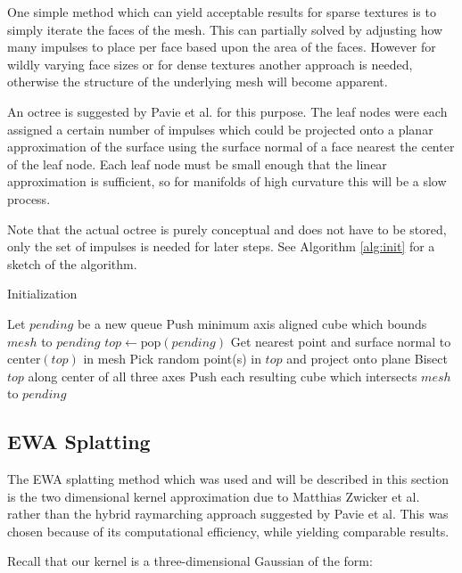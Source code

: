 \documentclass{article}
\begin{document}
One simple method which can yield acceptable results for sparse textures is to simply iterate the faces of the mesh. This can partially solved by adjusting how many impulses to place per face based upon the area of the faces. However for wildly varying face sizes or for dense textures another approach is needed, otherwise the structure of the underlying mesh will become apparent.

An octree is suggested by Pavie et al. for this purpose. The leaf nodes were each assigned a certain number of impulses which could be projected onto a planar approximation of the surface using the surface normal of a face nearest the center of the leaf node.
Each leaf node must be small enough that the linear approximation is sufficient, so for manifolds of high curvature this will be a slow process.

Note that the actual octree is purely conceptual and does not have to be stored, only the set of impulses is needed for later steps. See Algorithm \ref{alg:init} for a sketch of the algorithm.

\begin{algorithm}
\caption{Initialization} \label{alg:init}
\begin{algorithmic}
\State Let ${pending}$ be a new queue
\State Push minimum axis aligned cube which bounds ${mesh}$ to ${pending}$
\State ${top} \gets \text{pop}({pending})$
\State Get nearest point and surface normal to $\text{center}({top})$ in mesh
\State Pick random point(s) in ${top}$ and project onto plane
\Else
\State Bisect ${top}$ along center of all three axes
\State Push each resulting cube which intersects ${mesh}$ to ${pending}$
\EndIf
\EndWhile
\end{algorithmic}
\end{algorithm}

\subsection{EWA Splatting}

The EWA splatting method which was used and will be described in this section is the two dimensional kernel approximation due to Matthias Zwicker et al. rather than the hybrid raymarching approach suggested by Pavie et al.\cite{10.1109/TVCG.2002.1021576}\cite{pavie:hal-02413269} This was chosen because of its computational efficiency, while yielding comparable results.

Recall that our kernel is a three-dimensional Gaussian of the form:
\end{document}
